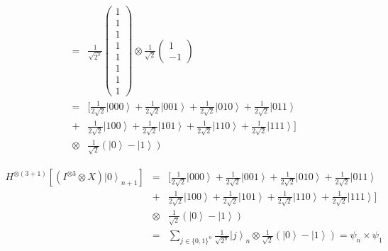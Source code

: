 \begin{frame}
	\begin{exampleblock}{}
		\begin{eqnarray}
			&=&\frac{1}{\sqrt{2^{3}}}\left(\begin{array}{c}
			1\\
			1\\
			1\\
			1\\
			1\\
			1\\
			1\\
			1
			\end{array}\right)\otimes\frac{1}{\sqrt{2}}\left(\begin{array}{c}
			1\\
			-1
			\end{array}\right)\\
			&=&[ \frac{1}{2\sqrt{2}}\left.|000\right\rangle +\frac{1}{2\sqrt{2}}\left.|001\right\rangle +\frac{1}{2\sqrt{2}}\left.|010\right\rangle +\frac{1}{2\sqrt{2}}\left.|011\right\rangle \\&+&\frac{1}{2\sqrt{2}}\left.|100\right\rangle +\frac{1}{2\sqrt{2}}\left.|101\right\rangle +\frac{1}{2\sqrt{2}}\left.|110\right\rangle +\frac{1}{2\sqrt{2}}\left.|111\right\rangle] \\&\otimes&\frac{1}{\sqrt{2}}\left(\left.|0\right\rangle -\left.|1\right\rangle \right)			
		\end{eqnarray}
	\end{exampleblock}
\end{frame}

\begin{frame}{}
	\begin{exampleblock}{}
		\begin{eqnarray}
			H^{\otimes\left(3+1\right)}\left[(I^{\otimes3}\otimes X)\left.|0\right\rangle _{n+1}\right]
			&=&[\frac{1}{2\sqrt{2}}\left.|000\right\rangle +\frac{1}{2\sqrt{2}}\left.|001\right\rangle +\frac{1}{2\sqrt{2}}\left.|010\right\rangle +\frac{1}{2\sqrt{2}}\left.|011\right\rangle\nonumber\\ &+&\frac{1}{2\sqrt{2}}\left.|100\right\rangle +\frac{1}{2\sqrt{2}}\left.|101\right\rangle +\frac{1}{2\sqrt{2}}\left.|110\right\rangle +\frac{1}{2\sqrt{2}}\left.|111\right\rangle ]\nonumber\\
			&\otimes&\frac{1}{\sqrt{2}}\left(\left.|0\right\rangle -\left.|1\right\rangle \right)\nonumber\\
			&=&\sum_{j\in\{0,1\}^{n}}\frac{1}{\sqrt{2^{n}}}\left.|j\right\rangle _{n}\otimes\frac{1}{\sqrt{2}}\left(\left.|0\right\rangle -\left.|1\right\rangle \right)=\psi_{n}\times\psi_{1}
		\end{eqnarray}
	\end{exampleblock}
\end{frame}


